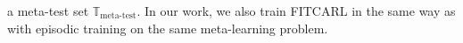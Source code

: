 \documentclass[runningheads]{llncs}
\begin{document}
a meta-test set $\mathbb{T}_{\text{meta-test}}$. 
In our work, we also train FITCARL in the same way as \cite{ding2022few} with episodic training on the same meta-learning problem. 
\end{document}
